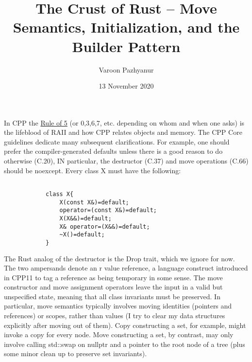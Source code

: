 \documentclass[8pt]{beamer}
\title {The Crust of Rust -- Move Semantics, Initialization, and the Builder Pattern}
\author{Varoon Pazhyanur}
\institute{Bloomberg L.P.}
\date{13 November 2020}
\theoremstyle{remark}
\begin{document}
    \begin{frame}
        \titlepage 
    \end{frame}
    \begin{frame}[fragile]
        In CPP the
        \href{https://isocpp.github.io/CppCoreGuidelines/CppCoreGuidelines\#S-ctor}{Rule
        of 5} (or 0,3,6,7, etc. depending on whom and when one
        asks) is the lifeblood of RAII and how CPP relates objects and memory.
        The CPP Core guidelines dedicate many subsequent clarifications. For
        example, one should prefer the compiler-generated defaults unless there
        is a good reason to do otherwise (C.20), IN particular, the destructor
        (C.37) and move operations (C.66) should be noexcept. Every class X
        must have the following:

        \begin{verbatim}

            class X{
                X(const X&)=default;
                operator=(const X&)=default;
                X(X&&)=default;
                X& operator=(X&&)=default;
                ~X()=default; 
            }
        \end{verbatim}
        The Rust analog of the destructor is the Drop trait, which we ignore
        for now. The two ampersands denote an r value reference, a language
        construct introduced in CPP11 to tag a reference as being temporary in
        some sense. The move constructor and move assignment operators leave
        the input in a valid but unspecified state, meaning that all class
        invariants must be preserved. In particular, move semantics typically
        involves moving identities (pointers and references) or scopes, rather
        than values (I try to clear my data structures explicitly after moving
        out of them). Copy constructing a set, for example, might invoke a copy
        for every node. Move constructing a set, by contrast, may only involve
        calling std::swap on nullptr and a pointer to the root node of a tree
        (plus some minor clean up to preserve set invariants). 
    \end{frame}
\end{document}
